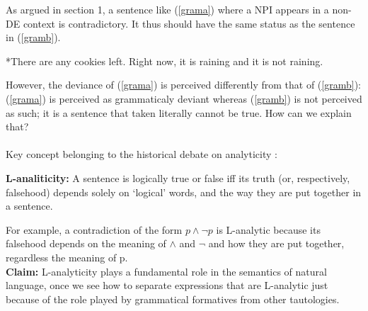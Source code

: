 \documentclass[a4paper,11pt]{article}
\newcommand{\reff}[1]{(\ref{#1})}
\begin{document}
 As argued in section 1, a sentence like \reff{grama} where a NPI appears in a non-DE context is contradictory. It thus should have the same status as the sentence in \reff{gramb}.
 \begin{exe}
 \ex\label{gram} \begin{xlist}
 \ex\label{grama} *There are any cookies left.
 \ex\label{gramb} Right now, it is raining and it is not raining.
 \end{xlist}
 \end{exe}
 However, the deviance of (\ref{grama}) is perceived differently from that of (\ref{gramb}): (\ref{grama}) is perceived as grammaticaly deviant whereas (\ref{gramb}) is not perceived as such; it is a sentence that taken literally cannot be true. How can we explain that?
 \paragraph{}
 Key concept belonging to the historical debate on analyticity \citep{Car34,Qui60}: 
 \begin{exe}
 \ex \textbf{L-analiticity:} A sentence is logically true or false iff its truth (or, respectively, falsehood) depends solely on `logical' words, and the way they are put together in a sentence. 
 \end{exe}
 For example, a contradiction of the form $p\wedge \neg p$ is L-analytic because its falsehood depends on the meaning of $\wedge$ and $\neg$ and how they are put together, regardless the meaning of p.
 \\\textbf{Claim:} L-analyticity plays a fundamental role in the semantics of natural language, once we see how to separate expressions that are L-analytic just because of the role played by grammatical formatives from other tautologies.
\end{document}
